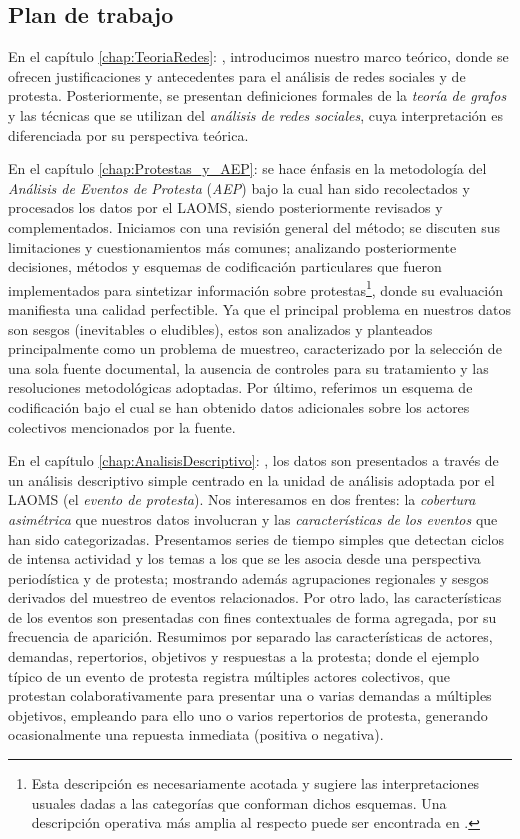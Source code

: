 \documentclass[letterpaper, 11pt]{book}
\theoremstyle{definition}
\theoremstyle{remark}
\begin{document}
\subsection*{Plan de trabajo}
\label{sec:plan_de_trabajo}


En el capítulo \ref{chap:TeoriaRedes}: , introducimos nuestro marco teórico, donde se ofrecen justificaciones y antecedentes para el análisis de redes sociales y de protesta. 
Posteriormente, se presentan definiciones formales de la \emph{teoría de grafos} y las técnicas que se utilizan del \emph{análisis de redes sociales}, cuya interpretación es diferenciada por su perspectiva teórica. 


En el capítulo \ref{chap:Protestas_y_AEP}:  se hace énfasis en la metodología del \emph{Análisis de Eventos de Protesta} (\emph{AEP}) bajo la cual han sido recolectados y procesados los datos por el LAOMS, siendo posteriormente revisados y complementados. 
Iniciamos con una revisión general del método; se discuten sus limitaciones y cuestionamientos más comunes; analizando posteriormente decisiones, métodos y esquemas de codificación particulares que fueron implementados para sintetizar información sobre protestas\footnote{
    Esta descripción es necesariamente acotada y sugiere las interpretaciones usuales dadas a las categorías que conforman dichos esquemas. 
    Una descripción operativa más amplia al respecto puede ser encontrada en \citet{2017_Cadena_ManualLAOMS}.
}, 
donde su evaluación manifiesta una calidad perfectible. 
Ya que el principal problema en nuestros datos son sesgos (inevitables o eludibles), estos son analizados y planteados principalmente como un problema de muestreo, caracterizado por la selección de una sola fuente documental, la ausencia de controles para su tratamiento y las resoluciones metodológicas adoptadas. 
Por último, referimos un esquema de codificación bajo el cual se han obtenido datos adicionales sobre los actores colectivos mencionados por la fuente. 


En el capítulo \ref{chap:AnalisisDescriptivo}: , los datos son presentados a través de un análisis descriptivo simple centrado en la unidad de análisis adoptada por el LAOMS (el \emph{evento de protesta}). 
Nos interesamos en dos frentes: la \emph{cobertura asimétrica} que nuestros datos involucran y las \emph{características de los eventos} que han sido categorizadas. 
Presentamos series de tiempo simples que detectan ciclos de intensa actividad y los temas a los que se les asocia desde una perspectiva periodística y de protesta; mostrando además agrupaciones regionales y sesgos derivados del muestreo de eventos relacionados. 
Por otro lado, las características de los eventos son presentadas con fines contextuales de forma agregada, por su frecuencia de aparición. Resumimos por separado las características de actores, demandas, repertorios, objetivos y respuestas a la protesta; donde el ejemplo típico de un evento de protesta registra múltiples actores colectivos, que protestan colaborativamente para presentar una o varias demandas a múltiples objetivos, empleando para ello uno o varios repertorios de protesta, generando ocasionalmente una repuesta inmediata (positiva o negativa). 
\end{document}
